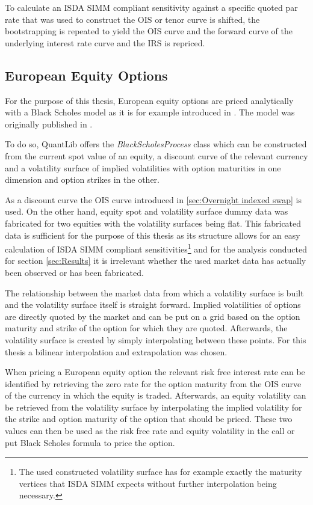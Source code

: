 \documentclass[../Thesis_AHoecherl.tex]{subfiles}
\begin{document}
    To calculate an \gls{ISDA SIMM} compliant sensitivity against a specific quoted par rate that was used to construct the \gls{OIS} or tenor curve is shifted, the bootstrapping is repeated to yield the \gls{OIS} curve and the forward curve of the underlying interest rate curve and the \gls{IRS} is repriced.    

    \subsection{European Equity Options}\label{sec:European Equity Options}

    For the purpose of this thesis, European equity options are priced analytically with a Black Scholes model as it is for example introduced in \cite[Chapter 14]{hull2009options}. The model was originally published in \cite{black1973pricing}.

    To do so, QuantLib offers the \emph{BlackScholesProcess} class which can be constructed from the current spot value of an equity, a discount curve of the relevant currency and a volatility surface of implied volatilities with option maturities in one dimension and option strikes in the other.

    As a discount curve the \gls{OIS} curve introduced in \ref{sec:Overnight indexed swap} is used.
    On the other hand, equity spot and volatility surface dummy data was fabricated for two equities with the volatility surfaces being flat.
    This fabricated data is sufficient for the purpose of this thesis as its structure allows for an easy calculation of \gls{ISDA SIMM} compliant sensitivities\footnote{The used constructed volatility surface has for example exactly the maturity vertices that \gls{ISDA SIMM} expects without further interpolation being necessary.} and for the analysis conducted for section \ref{sec:Results} it is irrelevant whether the used market data has actually been observed or has been fabricated.

    The relationship between the market data from which a volatility surface is built and the volatility surface itself is straight forward.
    Implied volatilities of options are directly quoted by the market and can be put on a grid based on the option maturity and strike of the option for which they are quoted.
    Afterwards, the volatility surface is created by simply interpolating between these points. For this thesis a bilinear interpolation and extrapolation was chosen.

    When pricing a European equity option the relevant risk free interest rate can be identified by retrieving the zero rate for the option maturity from the \gls{OIS} curve of the currency in which the equity is traded.
    Afterwards, an equity volatility can be retrieved from the volatility surface by interpolating the implied volatility for the strike and option maturity of the option that should be priced.
    These two values can then be used as the risk free rate and equity volatility in the call or put Black Scholes formula to price the option.
\end{document}
